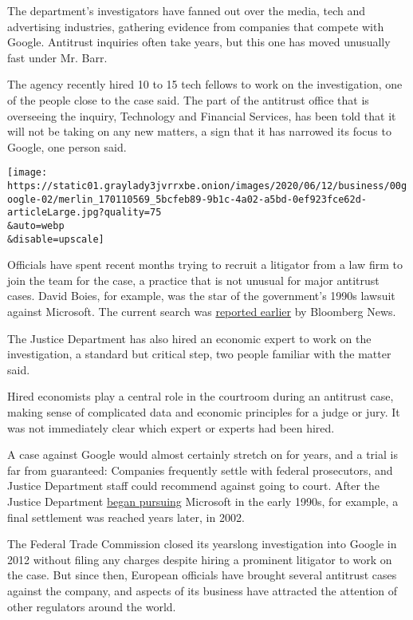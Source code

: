 The department's investigators have fanned out over the media, tech and
advertising industries, gathering evidence from companies that compete
with Google. Antitrust inquiries often take years, but this one has
moved unusually fast under Mr. Barr.

The agency recently hired 10 to 15 tech fellows to work on the
investigation, one of the people close to the case said. The part of the
antitrust office that is overseeing the inquiry, Technology and
Financial Services, has been told that it will not be taking on any new
matters, a sign that it has narrowed its focus to Google, one person
said.

\texttt{[image: https://static01.graylady3jvrrxbe.onion/images/2020/06/12/business/00google-02/merlin\_170110569\_5bcfeb89-9b1c-4a02-a5bd-0ef923fce62d-articleLarge.jpg?quality=75\\\&auto=webp\\\&disable=upscale]}

Officials have spent recent months trying to recruit a litigator from a
law firm to join the team for the case, a practice that is not unusual
for major antitrust cases. David Boies, for example, was the star of the
government's 1990s lawsuit against Microsoft. The current search was
\href{https://www.bloomberg.com/news/articles/2020-02-21/doj-solicited-outside-law-firm-for-help-with-tech-antitrust-case}{reported
earlier} by Bloomberg News.

The Justice Department has also hired an economic expert to work on the
investigation, a standard but critical step, two people familiar with
the matter said.

Hired economists play a central role in the courtroom during an
antitrust case, making sense of complicated data and economic principles
for a judge or jury. It was not immediately clear which expert or
experts had been hired.

A case against Google would almost certainly stretch on for years, and a
trial is far from guaranteed: Companies frequently settle with federal
prosecutors, and Justice Department staff could recommend against going
to court. After the Justice Department
\href{https://www.wired.com/2002/11/u-s-v-microsoft-timeline}{began
pursuing} Microsoft in the early 1990s, for example, a final settlement
was reached years later, in 2002.

The Federal Trade Commission closed its yearslong investigation into
Google in 2012 without filing any charges despite hiring a prominent
litigator to work on the case. But since then, European officials have
brought several antitrust cases against the company, and aspects of its
business have attracted the attention of other regulators around the
world.

